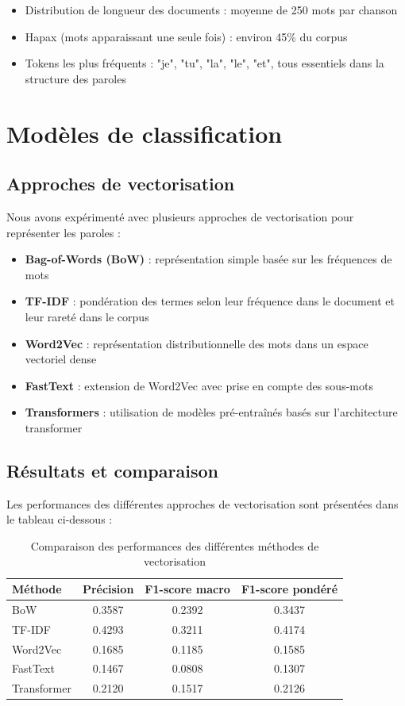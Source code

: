 \documentclass[a4paper,11pt]{article}
\begin{document}
\begin{itemize}
    \item Distribution de longueur des documents : moyenne de 250 mots par chanson
    \item Hapax (mots apparaissant une seule fois) : environ 45\% du corpus
    \item Tokens les plus fréquents : "je", "tu", "la", "le", "et", tous essentiels dans la structure des paroles
\end{itemize}

\section{Modèles de classification}
\label{sec:classification}

\subsection{Approches de vectorisation}
Nous avons expérimenté avec plusieurs approches de vectorisation pour représenter les paroles :

\begin{itemize}
    \item \textbf{Bag-of-Words (BoW)} : représentation simple basée sur les fréquences de mots
    \item \textbf{TF-IDF} : pondération des termes selon leur fréquence dans le document et leur rareté dans le corpus
    \item \textbf{Word2Vec} : représentation distributionnelle des mots dans un espace vectoriel dense
    \item \textbf{FastText} : extension de Word2Vec avec prise en compte des sous-mots
    \item \textbf{Transformers} : utilisation de modèles pré-entraînés basés sur l'architecture transformer
\end{itemize}

\subsection{Résultats et comparaison}
Les performances des différentes approches de vectorisation sont présentées dans le tableau ci-dessous :

\begin{table}[h]
\centering
\begin{tabular}{lccc}
\toprule
\textbf{Méthode} & \textbf{Précision} & \textbf{F1-score macro} & \textbf{F1-score pondéré} \\
\midrule
BoW & 0.3587 & 0.2392 & 0.3437 \\
TF-IDF & 0.4293 & 0.3211 & 0.4174 \\
Word2Vec & 0.1685 & 0.1185 & 0.1585 \\
FastText & 0.1467 & 0.0808 & 0.1307 \\
Transformer & 0.2120 & 0.1517 & 0.2126 \\
\bottomrule
\end{tabular}
\caption{Comparaison des performances des différentes méthodes de vectorisation}
\label{tab:classification-results}
\end{table}
\end{document}
